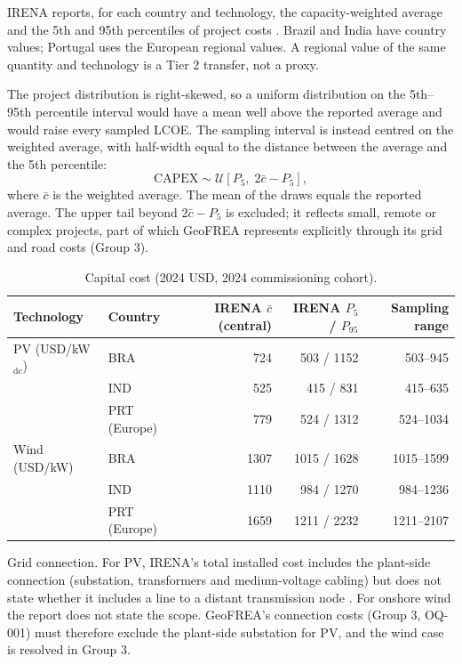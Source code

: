 IRENA reports, for each country and technology, the capacity-weighted
average and the 5th and 95th percentiles of project costs
\cite{irena2025costs2024}. Brazil and India have country values;
Portugal uses the European regional values. A regional value of the same
quantity and technology is a Tier 2 transfer, not a proxy.

The project distribution is right-skewed, so a uniform distribution on
the 5th--95th percentile interval would have a mean well above the
reported average and would raise every sampled LCOE. The sampling
interval is instead centred on the weighted average, with half-width
equal to the distance between the average and the 5th percentile:
\begin{equation}
    \mathrm{CAPEX} \sim \mathcal{U}\!\left[P_5,\; 2\bar{c}-P_5\right],
    \label{eq:g2_capex_interval}
\end{equation}
where $\bar{c}$ is the weighted average. The mean of the draws equals
the reported average. The upper tail beyond $2\bar{c}-P_5$ is excluded;
it reflects small, remote or complex projects, part of which GeoFREA
represents explicitly through its grid and road costs (Group 3).

\begin{table}[htbp]
    \centering
    \caption{Capital cost (2024 USD, 2024 commissioning cohort).}
    \label{tab:g2_capex}
    \small
    \begin{tabular}{llrrr}
        \toprule
        Technology & Country & IRENA $\bar{c}$ (central) & IRENA $P_5$ / $P_{95}$ & Sampling range \\
        \midrule
        PV (USD/kW$_{\mathrm{dc}}$) & BRA & 724 & 503 / 1152 & 503--945 \\
                                    & IND & 525 & 415 / 831  & 415--635 \\
                                    & PRT (Europe) & 779 & 524 / 1312 & 524--1034 \\
        \midrule
        Wind (USD/kW)               & BRA & 1307 & 1015 / 1628 & 1015--1599 \\
                                    & IND & 1110 & 984 / 1270  & 984--1236 \\
                                    & PRT (Europe) & 1659 & 1211 / 2232 & 1211--2107 \\
        \bottomrule
    \end{tabular}
\end{table}

Grid connection. For PV, IRENA's total installed cost includes the
plant-side connection (substation, transformers and medium-voltage
cabling) but does not state whether it includes a line to a distant
transmission node \cite{irena2025costs2024}. For onshore wind the report
does not state the scope. GeoFREA's connection costs (Group 3, OQ-001)
must therefore exclude the plant-side substation for PV, and the wind
case is resolved in Group 3.

